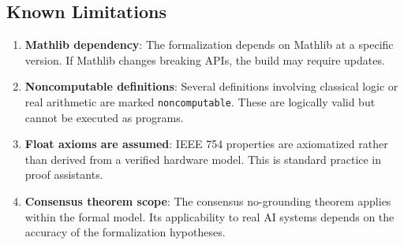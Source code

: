 \subsection{Known Limitations}

\begin{enumerate}
  \item \textbf{Mathlib dependency}: The formalization depends on Mathlib at a
        specific version. If Mathlib changes breaking APIs, the build may require
        updates.

  \item \textbf{Noncomputable definitions}: Several definitions involving
        classical logic or real arithmetic are marked \texttt{noncomputable}.
        These are logically valid but cannot be executed as programs.

  \item \textbf{Float axioms are assumed}: IEEE 754 properties are axiomatized
        rather than derived from a verified hardware model. This is standard
        practice in proof assistants.

  \item \textbf{Consensus theorem scope}: The consensus no-grounding theorem
        applies within the formal model. Its applicability to real AI systems
        depends on the accuracy of the formalization hypotheses.
\end{enumerate}
